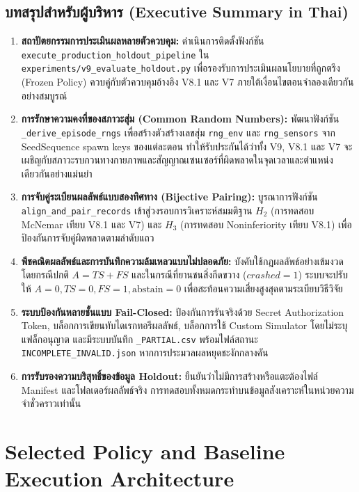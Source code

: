 \documentclass[10pt,a4paper]{article}
\begin{document}
\subsection{\texorpdfstring{บทสรุปสำหรับผู้บริหาร (Executive Summary in Thai)}{Executive Summary in Thai}}
{\thaifont\small
\begin{enumerate}
    \item \textbf{สถาปัตยกรรมการประเมินผลหลายตัวควบคุม:} ดำเนินการติดตั้งฟังก์ชัน \texttt{execute\_production\_holdout\_pipeline} ใน \texttt{experiments/v9\_evaluate\_holdout.py} เพื่อรองรับการประเมินผลนโยบายที่ถูกตรึง (Frozen Policy) ควบคู่กับตัวควบคุมอ้างอิง V8.1 และ V7 ภายใต้เงื่อนไขตอนจำลองเดียวกันอย่างสมบูรณ์
    \item \textbf{การรักษาความคงที่ของสภาวะสุ่ม (Common Random Numbers):} พัฒนาฟังก์ชัน \texttt{\_derive\_episode\_rngs} เพื่อสร้างตัวสร้างเลขสุ่ม \texttt{rng\_env} และ \texttt{rng\_sensors} จาก SeedSequence spawn keys ของแต่ละตอน ทำให้รับประกันได้ว่าทั้ง V9, V8.1 และ V7 จะเผชิญกับสภาวะรบกวนทางกายภาพและสัญญาณเซนเซอร์ที่ผิดพลาดในจุดเวลาและตำแหน่งเดียวกันอย่างแม่นยำ
    \item \textbf{การจับคู่ระเบียนผลลัพธ์แบบสองทิศทาง (Bijective Pairing):} บูรณาการฟังก์ชัน \texttt{align\_and\_pair\_records} เข้าสู่วงรอบการวิเคราะห์สมมติฐาน $H_2$ (การทดสอบ McNemar เทียบ V8.1 และ V7) และ $H_3$ (การทดสอบ Noninferiority เทียบ V8.1) เพื่อป้องกันการจับคู่ผิดพลาดตามลำดับแถว
    \item \textbf{พีชคณิตผลลัพธ์และการบันทึกความล้มเหลวแบบไม่ปลอดภัย:} บังคับใช้กฎผลลัพธ์อย่างเข้มงวด โดยกรณีปกติ $A = TS + FS$ และในกรณีที่ยานชนสิ่งกีดขวาง ($crashed=1$) ระบบจะปรับให้ $A=0, TS=0, FS=1, \text{abstain}=0$ เพื่อสะท้อนความเสี่ยงสูงสุดตามระเบียบวิธีวิจัย
    \item \textbf{ระบบป้องกันหลายชั้นแบบ Fail-Closed:} ป้องกันการรันจริงด้วย Secret Authorization Token, บล็อกการเขียนทับไดเรกทอรีผลลัพธ์, บล็อกการใช้ Custom Simulator โดยไม่ระบุแฟล็กอนุญาต และมีระบบบันทึก \texttt{\_PARTIAL.csv} พร้อมไฟล์สถานะ \texttt{INCOMPLETE\_INVALID.json} หากการประมวลผลหยุดชะงักกลางคัน
    \item \textbf{การรับรองความบริสุทธิ์ของข้อมูล Holdout:} ยืนยันว่าไม่มีการสร้างหรือแตะต้องไฟล์ Manifest และโฟลเดอร์ผลลัพธ์จริง การทดสอบทั้งหมดกระทำบนข้อมูลสังเคราะห์ในหน่วยความจำชั่วคราวเท่านั้น
\end{enumerate}
}

\section{Selected Policy and Baseline Execution Architecture}
\end{document}
